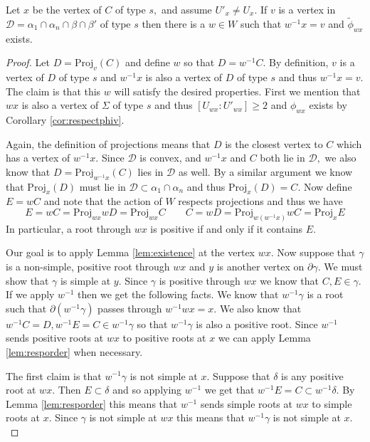 \documentclass[class=book, crop=false,12 pt]{standalone}
\begin{document}
\begin{lemma}
	\label{lem:Dexists}
	Let $x$ be the vertex of $C$ of type $s,$ and assume $U'_x\neq U_x.$ If $v$ is a vertex in $\mathcal{D}=\alpha_1\cap \alpha_n\cap \beta \cap \beta'$ of type $s$ then there is a $w\in W$ such that $w^{-1}x=v$ and $\tilde{\phi}_{wx}$ exists.
\end{lemma}
\begin{proof}
	Let $D=\mathrm{Proj}_{v}(C)$ and define $w$ so that $D=w^{-1}C.$ By definition, $v$ is a vertex of $D$ of type $s$ and $w^{-1}x$ is also a vertex of $D$ of type $s$ and thus $w^{-1}x=v.$ The claim is that this $w$ will satisfy the desired properties. First we mention that $wx$ is also a vertex of $\Sigma$ of type $s$ and thus $[U_{wx}:U'_{wx}]\ge 2$ and $\phi_{wx}$ exists by Corollary \ref{cor:respectphiv}. 
	
	Again, the definition of projections means that $D$ is the closest vertex to $C$ which has a vertex of $w^{-1}x.$ Since $\mathcal{D}$ is convex, and $w^{-1}x$ and $C$ both lie in $\mathcal{D},$ we also know that $D=\mathrm{Proj}_{w^{-1}x}(C)$ lies in $\mathcal{D}$ as well. By a similar argument we know that $\mathrm{Proj}_{x}(D)$ must lie in $\mathcal{D}\subset \alpha_1\cap \alpha_n$ and thus $\mathrm{Proj}_{x}(D)=C.$ Now define $E=wC$ and note that the action of $W$ respects projections and thus we have
	\[
		E=wC=\mathrm{Proj}_{wx}{wD}=\mathrm{Proj}_{wx}{C} \qquad C=wD=\mathrm{Proj}_{w(w^{-1}x)}{wC}=\mathrm{Proj}_{x}{E}
	\]
In particular, a root through $wx$ is positive if and only if it contains $E.$

Our goal is to apply Lemma \ref{lem:existence} at the vertex $wx.$ Now suppose that $\gamma$ is a non-simple, positive root through $wx$ and $y$ is another vertex on $\partial \gamma.$ We must show that $\gamma$ is simple at $y.$ Since $\gamma$ is positive through $wx$ we know that $C,E\in \gamma.$ If we apply $w^{-1}$ then we get the following facts. We know that $w^{-1}\gamma$ is a root such that $\partial (w^{-1}\gamma)$ passes through $w^{-1}wx=x.$ We also know that $w^{-1}C=D,w^{-1}E=C\in w^{-1}\gamma$ so that $w^{-1}\gamma$ is also a positive root. Since $w^{-1}$ sends positive roots at $wx$ to positive roots at $x$ we can apply Lemma \ref{lem:resporder} when necessary.

The first claim is that $w^{-1}\gamma$ is not simple at $x.$ Suppose that $\delta$ is any positive root at $wx.$ Then $E\subset \delta$ and so applying $w^{-1}$ we get that $w^{-1}E=C\subset w^{-1}\delta.$  By Lemma \ref{lem:resporder} this means that $w^{-1}$ sends simple roots at $wx$ to simple roots at $x.$ Since $\gamma$ is not simple at $wx$ this means that $w^{-1}\gamma$ is not simple at $x.$


\end{proof}
\end{document}
